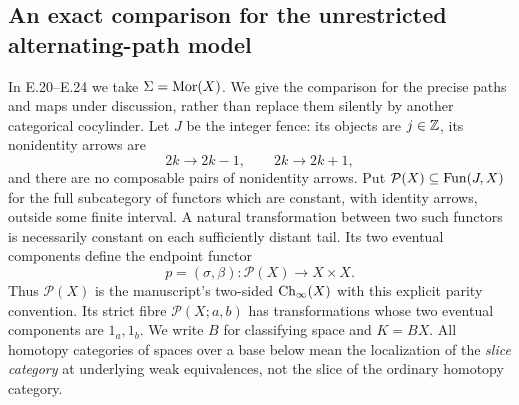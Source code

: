 \subsection{An exact comparison for the unrestricted alternating-path model}

In E.20--E.24 we take $\Sigma=\operatorname{Mor}(X)$. We give the comparison for the precise paths and maps under discussion, rather than replace them silently by another categorical cocylinder. Let $J$ be the integer fence: its objects are $j\in\mathbb Z$, its nonidentity arrows are
\[
                 2k\longrightarrow 2k-1,
                 \qquad 2k\longrightarrow 2k+1,
\]
and there are no composable pairs of nonidentity arrows. Put $\mathcal P(X)\subseteq\operatorname{Fun}(J,X)$ for the full subcategory of functors which are constant, with identity arrows, outside some finite interval. A natural transformation between two such functors is necessarily constant on each sufficiently distant tail. Its two eventual components define the endpoint functor
\[
 p=(\sigma,\beta):\mathcal P(X)\longrightarrow X\times X.
\]
Thus $\mathcal P(X)$ is the manuscript's two-sided $\mathrm{Ch}_\infty(X)$ with this explicit parity convention. Its strict fibre $\mathcal P(X;a,b)$ has transformations whose two eventual components are $1_a,1_b$. We write $B$ for classifying space and $K=BX$. All homotopy categories of spaces over a base below mean the localization of the \emph{slice category} at underlying weak equivalences, not the slice of the ordinary homotopy category.

